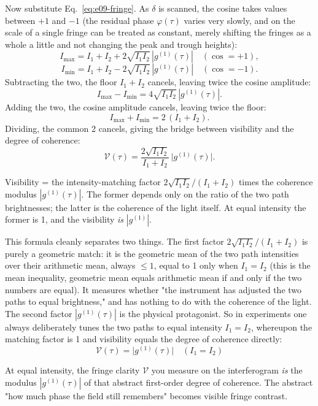Now substitute Eq.~\eqref{eq:e09-fringe}. As \(\delta\) is scanned, the cosine takes values between \(+1\) and \(-1\) (the residual phase \(\varphi(\tau)\) varies very slowly, and on the scale of a single fringe can be treated as constant, merely shifting the fringes as a whole a little and not changing the peak and trough heights):
\[
  I_{\max}=I_1+I_2+2\sqrt{I_1 I_2}\,|g^{(1)}(\tau)|
  \quad(\cos=+1),
\]
\[
  I_{\min}=I_1+I_2-2\sqrt{I_1 I_2}\,|g^{(1)}(\tau)|
  \quad(\cos=-1).
\]
Subtracting the two, the floor \(I_1+I_2\) cancels, leaving twice the cosine amplitude:
\[
  I_{\max}-I_{\min}=4\sqrt{I_1 I_2}\,|g^{(1)}(\tau)| .
\]
Adding the two, the cosine amplitude cancels, leaving twice the floor:
\[
  I_{\max}+I_{\min}=2\,(I_1+I_2).
\]
Dividing, the common 2 cancels, giving the bridge between visibility and the degree of coherence:
\begin{equation}
  \mathcal V(\tau)=\frac{2\sqrt{I_1 I_2}}{I_1+I_2}\,\big|g^{(1)}(\tau)\big| .
  \label{eq:e09-visibility-g1}
\end{equation}
\begin{formulaexplain}
Visibility = the intensity-matching factor \(2\sqrt{I_1I_2}/(I_1+I_2)\) times the coherence modulus \(|g^{(1)}(\tau)|\). The former depends only on the ratio of the two path brightnesses; the latter is the coherence of the light itself. At equal intensity the former is 1, and the visibility \emph{is} \(|g^{(1)}|\).
\end{formulaexplain}

This formula cleanly separates two things. The first factor \(2\sqrt{I_1 I_2}/(I_1+I_2)\) is purely a geometric match: it is the geometric mean of the two path intensities over their arithmetic mean, always \(\le 1\), equal to 1 only when \(I_1=I_2\) (this is the mean inequality, geometric mean equals arithmetic mean if and only if the two numbers are equal). It measures whether "the instrument has adjusted the two paths to equal brightness," and has nothing to do with the coherence of the light. The second factor \(|g^{(1)}(\tau)|\) is the physical protagonist. So in experiments one always deliberately tunes the two paths to equal intensity \(I_1=I_2\), whereupon the matching factor is 1 and visibility equals the degree of coherence directly:
\begin{equation}
  \boxed{\;\mathcal V(\tau)=\big|g^{(1)}(\tau)\big|\quad(I_1=I_2)\;}
  \label{eq:e09-visibility-equals-g1}
\end{equation}
\begin{formulaexplain}
At equal intensity, the fringe clarity \(\mathcal V\) you measure on the interferogram \emph{is} the modulus \(|g^{(1)}(\tau)|\) of that abstract first-order degree of coherence. The abstract "how much phase the field still remembers" becomes visible fringe contrast.
\end{formulaexplain}

